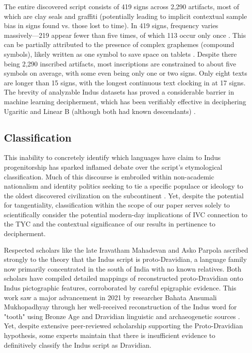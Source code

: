 \documentclass[11pt,a4paper,oneside]{report}
\begin{document}
The entire discovered script consists of 419 signs across 2,290 artifacts, most of which are clay seals and graffiti (potentially leading to implicit contextual sample bias in signs found vs. those lost to time). In 419 signs, frequency varies massively—219 appear fewer than five times, of which 113 occur only once \cite{zvelebil_dravidian_1997}. This can be partially attributed to the presence of complex graphemes (compound symbols), likely written as one symbol to save space on tablets \cite{fuls_ancient_2020}. Despite there being 2,290 inscribed artifacts, most inscriptions are constrained to about five symbols on average, with some even being only one or two signs. Only eight texts are longer than 15 signs, with the longest continuous text clocking in at 17 signs. The brevity of analyzable Indus datasets has proved a considerable barrier in machine learning decipherment, which has been verifiably effective in deciphering Ugaritic and Linear B (although both had known descendants) \cite{luo_neural_2019}.

\subsection{Classification}
\noindent\hspace{1cm}
This inability to concretely identify which languages have claim to Indus progenitorship has sparked inflamed debate over the script's etymological classification. Much of this discourse is embroiled within non-academic nationalism and identity politics seeking to tie a specific populace or ideology to the oldest discovered civilization on the subcontinent \cite{kb_want_2025}. Yet, despite the potential for tangentiality, classification within the scope of our paper serves solely to scientifically consider the potential modern-day implications of IVC connection to the TYC and the contextual significance of our results in pertinence to decipherment.

Respected scholars like the late Iravatham Mahadevan \cite{mahadevan_akam_2010, mahadevan_dravidian_2014, mahadevan_indus_2009, mahadevan_indus_2011, mahadevan_indus_2021, mahadevan_interpreting_2015, mahadevan_study_1975, mahadevan_towards_nodate, mahadevan_wide-ranging_1998} and Asko Parpola \cite{parpola_corpus_2010, parpola_deciphering_1994, parpola_religion_1988, parpola_roots_2015, parpola_special_2005} ascribed strongly to the theory that the Indus script is proto-Dravidian, a language family now primarily concentrated in the south of India with no known relatives. Both scholars have compiled detailed mappings of reconstructed proto-Dravidian onto Indus pictographic features, corroborated by careful epigraphic evidence. This work saw a major advancement in 2021 by researcher Bahata Ansumali Mukhopadhyay through her well-received reconstruction of the Indus word for "tooth" using Bronze Age and Dravidian linguistic and archaeogenetic sources \cite{mukhopadhyay_ancestral_2021}. Yet, despite extensive peer-reviewed scholarship supporting the Proto-Dravidian hypothesis, some experts maintain that there is insufficient evidence to definitively classify the Indus script as Dravidian.
\end{document}
